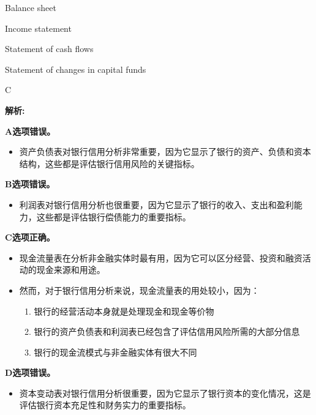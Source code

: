 \documentclass{article}
\newenvironment{explanation}
{\textbf{解析:}\par}
{\par}
\begin{document}
\begin{choices}
    \item Balance sheet
    \item Income statement
    \item Statement of cash flows
    \item Statement of changes in capital funds
\end{choices}

\begin{correctanswer}
    C
\end{correctanswer}

\begin{explanation}
    \textbf{A选项错误。}
    \begin{itemize}
        \item 资产负债表对银行信用分析非常重要，因为它显示了银行的资产、负债和资本结构，这些都是评估银行信用风险的关键指标。
    \end{itemize}
    
    \textbf{B选项错误。}
    \begin{itemize}
        \item 利润表对银行信用分析也很重要，因为它显示了银行的收入、支出和盈利能力，这些都是评估银行偿债能力的重要指标。
    \end{itemize}
    
    \textbf{C选项正确。}
    \begin{itemize}
        \item 现金流量表在分析非金融实体时最有用，因为它可以区分经营、投资和融资活动的现金来源和用途。
        \item 然而，对于银行信用分析来说，现金流量表的用处较小，因为：
        \begin{enumerate}
            \item 银行的经营活动本身就是处理现金和现金等价物
            \item 银行的资产负债表和利润表已经包含了评估信用风险所需的大部分信息
            \item 银行的现金流模式与非金融实体有很大不同
        \end{enumerate}
    \end{itemize}
    
    \textbf{D选项错误。}
    \begin{itemize}
        \item 资本变动表对银行信用分析很重要，因为它显示了银行资本的变化情况，这是评估银行资本充足性和财务实力的重要指标。
    \end{itemize}
\end{explanation}
\end{document}
